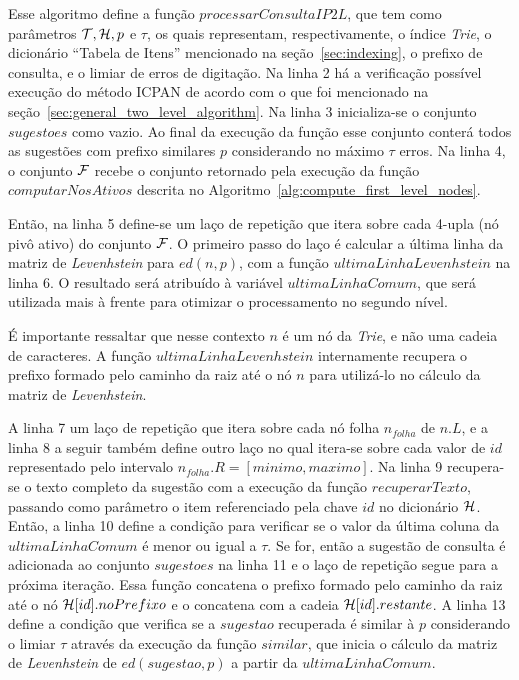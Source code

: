 Esse algoritmo define a função $processarConsultaIP2L$, que tem como parâmetros $\mathcal{T}, \mathcal{H}, p$ e $\tau$, os quais representam, respectivamente, o índice \textit{Trie}, o dicionário ``Tabela de Itens'' mencionado na seção~\ref{sec:indexing}, o prefixo de consulta, e o limiar de erros de digitação. Na linha 2 há a verificação possível execução do método ICPAN de acordo com o que foi mencionado na seção~\ref{sec:general_two_level_algorithm}. Na linha 3 inicializa-se o conjunto $sugestoes$ como vazio. Ao final da execução da função esse conjunto conterá todos as sugestões com prefixo similares $p$ considerando no máximo $\tau$ erros. Na linha 4, o conjunto $\mathcal{F}$ recebe o conjunto retornado pela execução da função $computarNosAtivos$ descrita no Algoritmo~\ref{alg:compute_first_level_nodes}. 

Então, na linha 5 define-se um laço de repetição que itera sobre cada 4-upla (nó pivô ativo) do conjunto $\mathcal{F}$. O primeiro passo do laço é calcular a última linha da matriz de \textit{Levenhstein} para $ed(n, p)$, com a função $ultimaLinhaLevenhstein$ na linha 6. O resultado será atribuído à variável $ultimaLinhaComum$, que será utilizada mais à frente para otimizar o processamento no segundo nível. 

É importante ressaltar que nesse contexto $n$ é um nó da \textit{Trie}, e não uma cadeia de caracteres. A função $ultimaLinhaLevenhstein$ internamente recupera o prefixo formado pelo caminho da raiz até o nó $n$ para utilizá-lo no cálculo da matriz de \textit{Levenhstein}. 

A linha 7 um laço de repetição que itera sobre cada nó folha $n_{folha}$ de $n.L$, e a linha 8 a seguir também define outro laço no qual itera-se sobre cada valor de $id$ representado pelo intervalo $n_{folha}.R = [minimo, maximo]$. Na linha 9 recupera-se o texto completo da sugestão com a execução da função $recuperarTexto$, passando como parâmetro o item referenciado pela chave $id$ no dicionário $\mathcal{H}$. Então, a linha 10 define a condição para verificar se o valor da última coluna da $ultimaLinhaComum$ é menor ou igual a $\tau$. Se for, então a sugestão de consulta é adicionada ao conjunto $sugestoes$ na linha 11 e o laço de repetição segue para a próxima iteração. Essa função concatena o prefixo formado pelo caminho da raiz até o nó $\mathcal{H}[id].noPrefixo$ e o concatena com a cadeia $\mathcal{H}[id].restante$. A linha 13 define a condição que verifica se a $sugestao$ recuperada é similar à $p$ considerando o limiar $\tau$ através da execução da função $similar$, que inicia o cálculo da matriz de \textit{Levenhstein} de $ed(sugestao, p)$ a partir da $ultimaLinhaComum$. 

